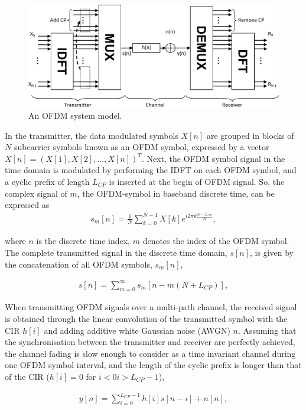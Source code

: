 \begin{figure}
	\centerline{\includegraphics [width=0.8\columnwidth] {Figures/OFDM-model.pdf} }
	\caption{An OFDM system model.}
	\label{fig:OFDM-model}
\end{figure}

In the transmitter, the data modulated symbols $X[n]$ are grouped in blocks of $N$ subcarrier symbols known as an OFDM symbol, expressed by a vector $X[n]=(X[1], X[2], ..., X[n])^T$.
Next, the OFDM symbol signal in the time domain is modulated by performing the IDFT on each OFDM symbol, and a cyclic prefix of length $L_{CP}$ is inserted at the begin of OFDM signal.
So, the complex signal of $m$, the OFDM-symbol in baseband discrete time, can be expressed as
\begin{eqnarray}
\label{equ:OFDMsymbol}
s_{m}[n] = \frac{1}{N} \sum_{k=0}^{N-1}X[k]e^{i2\pi k\frac{n-L_{CP}}{N}},
\end{eqnarray}

where $n$ is the discrete time index, $m$ denotes the index of the OFDM symbol.
The complete transmitted signal in the discrete time domain, $s[n]$, is given by the concatenation of all OFDM symbols, $s_{m}[n]$,

\begin{eqnarray}
\label{equ:OFDMsignal}
s[n] =  \sum_{m=0}^{\infty} s_{m}[n-m(N+L_{CP})],
\end{eqnarray}

When transmitting OFDM signals over a multi-path channel, the received signal is obtained through the linear convolution of the transmitted symbol with the CIR $h[i]$ and adding additive white Gaussian noise (AWGN) $n$.
Assuming that the synchronisation between the transmitter and receiver are perfectly achieved, the channel fading is slow enough to consider as a time invariant channel during one OFDM symbol interval, and the length of the cyclic prefix is longer than that of the CIR ($h[i] = 0$ for $i < 0 i > L_{CP}-1$),

\begin{eqnarray}
\label{equ:OFDMchannelsignal}
y[n] =  \sum_{i=0}^{L_{CP}-1} h[i]s[n-i] + n[n],
\end{eqnarray}

